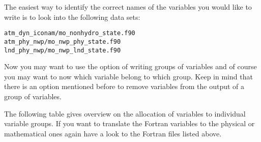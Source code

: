 The easiest way to identify the correct names of the variables you would like to write is to look into the following data sets:

\begin{Verbatim}[frame=single]
atm_dyn_iconam/mo_nonhydro_state.f90
atm_phy_nwp/mo_nwp_phy_state.f90
lnd_phy_nwp/mo_nwp_lnd_state.f90
\end{Verbatim}

Now you may want to use the option of writing groups of variables and of course you may want to now which variable belong to which group.
Keep in mind that there is an option mentioned before to remove variables from the output of a group of variables.

The following table gives overview on the allocation of variables to individual variable groups. If you want to translate the Fortran variables to the physical or mathematical ones again have a look to the Fortran files listed above.


